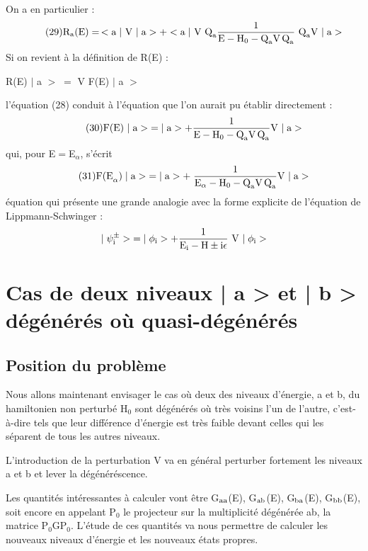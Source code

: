 On a en particulier :
\[
\tag{29}\text{R}_{\text{a}}\text{(E)}=\,<\text{a}\;|\text{ V }|\;\text{a}>+
<\text{a}\;|\text{ V Q}_{\text{a}}\frac{1}{\text{E}-\text{H}_0-\text{Q}_{\text{a}}\text{V\,Q}_{\text{a}}}\text{ Q}_{\text{a}}\text{V }|\;\text{a}>
\]
Si on revient à la définition de R(E) :
\begin{center}
R(E) $|$ a $>\;=$ V F(E) $|$ a $>$
\end{center}
l'équation (28) conduit à l'équation que l'on aurait pu établir directement :
\[
\tag{30}\text{F(E) }|\;\text{a}>\;=|\;\text{a}>+\frac{1}{\text{E}-\text{H}_0-\text{Q}_{\text{a}}\text{V\,Q}_{\text{a}}}\text{V }|\;\text{a}>
\]
qui, pour E$=$E$_\alpha$, s'écrit
\[
\tag{31}\text{F(E}_\alpha)\;|\;\text{a}>\;=|\;\text{a}>+\;
\frac{1}{\text{E}_\alpha-\text{H}_0-\text{Q}_{\text{a}}\text{V\,Q}_{\text{a}}}\text{V }|\;\text{a}>
\]
équation qui présente une grande analogie avec la forme explicite de
l'équation de Lippmann-Schwinger :
\[
|\;\psi_{\text{i}}^\pm>\;=|\;\phi_{\text{i}}>+\frac{1}{\text{E}_{\text{i}}-\text{H}\pm\text{i}\epsilon}\text{ V }|\;\phi_{\text{i}}>
\]
\section{Cas de deux niveaux | a > et | b > dégénérés où quasi-dégénérés}%
\subsection{Position du problème}%
Nous allons maintenant envisager le cas où deux des niveaux d'énergie, a et b, du hamiltonien
non perturbé H$_0$ sont dégénérés où très voisins l'un
de l'autre, c'est-à-dire tels que leur différence d'énergie est très faible devant
celles qui les séparent de tous les autres niveaux.
\begin{center}
 \end{center}

L'introduction de la perturbation V va en général perturber fortement
les niveaux a et b et lever la dégénéréscence.

Les quantités intéressantes à calculer vont être G$_{\text{aa}}$(E), G$_{\text{ab}}$(E), G$_{\text{ba}}$(E),
G$_{\text{bb}}$(E), soit encore en appelant P$_0$ le projecteur sur la multiplicité
dégénérée ab, la matrice P$_0$GP$_0$. L'étude de ces quantités va nous permettre
de calculer les nouveaux niveaux d'énergie et les nouveaux états propres.


